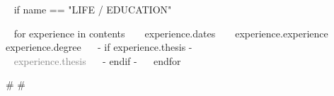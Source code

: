 

\medskip

\selectfont


\begin{minipage}{\textwidth}

~{ if name == "LIFE / EDUCATION" }~
  \begin{entrylist}
  ~{ for experience in contents }~
      \entry
        {~{{ experience.dates }}~} %
        {~{{ experience.experience }}~} %
        {} %
        {~{{ experience.degree }}~ 
        ~{- if experience.thesis -}~ \\ \textcolor{gray}{~{{ experience.thesis }}~} ~{- endif -}~
        } %
  ~{ endfor }~
  \end{entrylist}


{# 
#}




\end{minipage}
